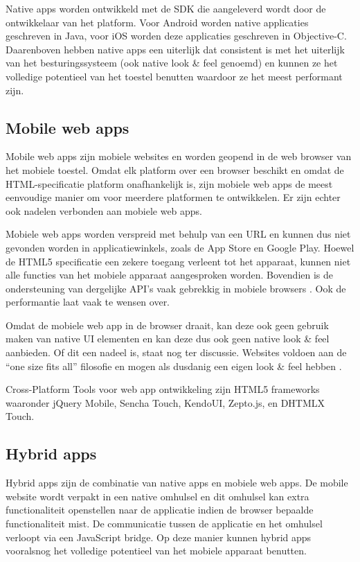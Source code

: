 \documentclass[a4paper]{IEEEconf}
\begin{document}
Native apps worden ontwikkeld met de SDK die aangeleverd wordt door de ontwikkelaar van het platform. Voor Android worden native applicaties geschreven in Java, voor iOS worden deze applicaties geschreven in Objective-C. Daarenboven hebben native apps een uiterlijk dat consistent is met het uiterlijk van het besturingssysteem (ook native look \& feel genoemd) en kunnen ze het volledige potentieel van het toestel benutten waardoor ze het meest performant zijn. 

\subsection{Mobile web apps}

Mobile web apps zijn mobiele websites en worden geopend in de web browser van het mobiele toestel. Omdat elk platform over een browser beschikt en omdat de HTML-specificatie platform onafhankelijk is, zijn mobiele web apps de meest eenvoudige manier om voor meerdere platformen te ontwikkelen. Er zijn echter ook nadelen verbonden aan mobiele web apps.

Mobiele web apps worden verspreid met behulp van een URL en kunnen dus niet gevonden worden in applicatiewinkels, zoals de App Store en Google Play. Hoewel de HTML5 specificatie een zekere toegang verleent tot het apparaat, kunnen niet alle functies van het mobiele apparaat aangesproken worden. Bovendien is de ondersteuning van dergelijke API's vaak gebrekkig in mobiele browsers \cite{MobileHTML5}. Ook de performantie laat vaak te wensen over.

Omdat de mobiele web app in de browser draait, kan deze ook geen gebruik maken van native UI elementen en kan deze dus ook geen native look \& feel aanbieden. Of dit een nadeel is, staat nog ter discussie. Websites voldoen aan de ``one size fits all'' filosofie en mogen als dusdanig een eigen look \& feel hebben \cite{Mahemoff:2011}.

Cross-Platform Tools voor web app ontwikkeling zijn HTML5 frameworks waaronder jQuery Mobile, Sencha Touch, KendoUI, Zepto.js, en DHTMLX Touch.

\subsection{Hybrid apps}

Hybrid apps zijn de combinatie van native apps en mobiele web apps. De mobile website wordt verpakt in een native omhulsel en dit omhulsel kan extra functionaliteit openstellen naar de applicatie indien de browser bepaalde functionaliteit mist. De communicatie tussen de applicatie en het omhulsel verloopt via een JavaScript bridge. Op deze manier kunnen hybrid apps vooralsnog het volledige potentieel van het mobiele apparaat benutten.
\end{document}
